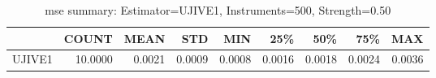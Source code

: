 \begin{table}[ht]
\centering
\caption{mse summary: Estimator=UJIVE1, Instruments=500, Strength=0.50}
\begin{tabular}{lrrrrrrrr}
\toprule
 & COUNT & MEAN & STD & MIN & 25\% & 50\% & 75\% & MAX \\
\midrule
UJIVE1 & 10.0000 & 0.0021 & 0.0009 & 0.0008 & 0.0016 & 0.0018 & 0.0024 & 0.0036 \\
\bottomrule
\end{tabular}
\end{table}
